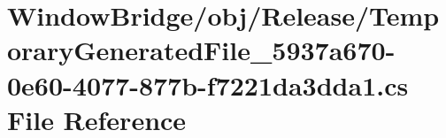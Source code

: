 \hypertarget{_window_bridge_2obj_2_release_2_temporary_generated_file__5937a670-0e60-4077-877b-f7221da3dda1_8cs}{}\section{Window\+Bridge/obj/\+Release/\+Temporary\+Generated\+File\+\_\+5937a670-\/0e60-\/4077-\/877b-\/f7221da3dda1.cs File Reference}
\label{_window_bridge_2obj_2_release_2_temporary_generated_file__5937a670-0e60-4077-877b-f7221da3dda1_8cs}
